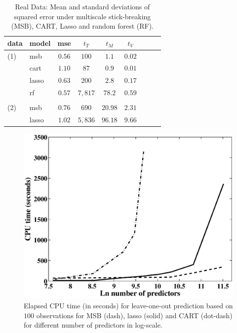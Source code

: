 \documentclass{article} %
\begin{document}
\begin{table}[t]
\caption{Real Data: Mean and standard deviations of squared error under multiscale stick-breaking (MSB), CART, Lasso and random forest (RF).}\label{real}
\vskip 0.15in
\begin{center}
\begin{small}
\begin{sc}
\begin{tabular}{llccccccc}
\hline
data  &model&mse&$t_{T}$ & $t_{M}$ & $t_{V}$\\
\hline
(1)&msb &$0.56$ & $100$ & $1.1$& $0.02$\\
 & cart & $1.10$ & $87$ & $0.9$ &$0.01$\\
& lasso & $0.63$  & $200$ & $2.8$ & $0.17$\\
& rf & $0.57$ &  $7,817$ & $78.2$ & $0.59$\\
\\
  (2)&msb &$0.76$ & $690$ & $20.98$& $2.31$\\
 & lasso & $1.02$  & $5,836$ & $96.18$ & $9.66$\\
\hline
\end{tabular}
\end{sc}
\end{small}
\end{center}
\vskip -0.1in
\end{table}


\nocite{langley00}



\begin{figure}[h!]
\centering
\includegraphics[width=0.8\linewidth]{Cpu.eps}
\caption{Elapsed CPU time (in seconds) for leave-one-out prediction based on $100$ observations for MSB (dash), lasso (solid) and CART (dot-dash) for different number of predictors in log-scale.} \label{Cpu}
\end{figure}
\end{document}
